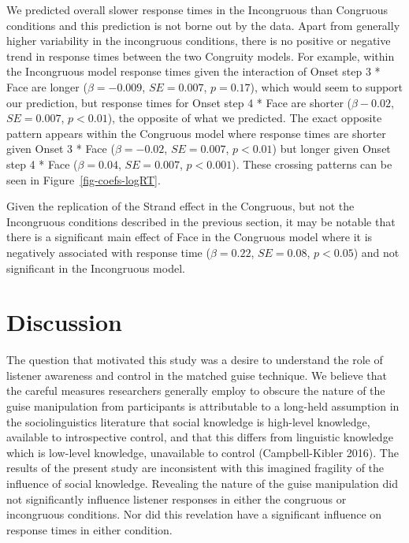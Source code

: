 \documentclass[
  letterpaper,
  DIV=11,
  numbers=noendperiod]{scrartcl}
\begin{document}
We predicted overall slower response times in the Incongruous than
Congruous conditions and this prediction is not borne out by the data.
Apart from generally higher variability in the incongruous conditions,
there is no positive or negative trend in response times between the two
Congruity models. For example, within the Incongruous model response
times given the interaction of Onset step 3 * Face are longer
(\(β=-0.009\), \(SE=0.007\), \(p = 0.17\)), which would seem to support
our prediction, but response times for Onset step 4 * Face are shorter
(\(β-0.02\), \(SE=0.007\), \(p < 0.01\)), the opposite of what we
predicted. The exact opposite pattern appears within the Congruous model
where response times are shorter given Onset 3 * Face (\(β=-0.02\),
\(SE=0.007\), \(p < 0.01\)) but longer given Onset step 4 * Face
(\(β=0.04\), \(SE=0.007\), \(p < 0.001\)). These crossing patterns can
be seen in Figure~\ref{fig-coefs-logRT}.

Given the replication of the Strand effect in the Congruous, but not the
Incongruous conditions described in the previous section, it may be
notable that there is a significant main effect of Face in the Congruous
model where it is negatively associated with response time (\(β=0.22\),
\(SE=0.08\), \(p < 0.05\)) and not significant in the Incongruous model.

\section{Discussion}\label{discussion}

The question that motivated this study was a desire to understand the
role of listener awareness and control in the matched guise technique.
We believe that the careful measures researchers generally employ to
obscure the nature of the guise manipulation from participants is
attributable to a long-held assumption in the sociolinguistics
literature that social knowledge is high-level knowledge, available to
introspective control, and that this differs from linguistic knowledge
which is low-level knowledge, unavailable to control (Campbell-Kibler
2016). The results of the present study are inconsistent with this
imagined fragility of the influence of social knowledge. Revealing the
nature of the guise manipulation did not significantly influence
listener responses in either the congruous or incongruous conditions.
Nor did this revelation have a significant influence on response times
in either condition.
\end{document}
